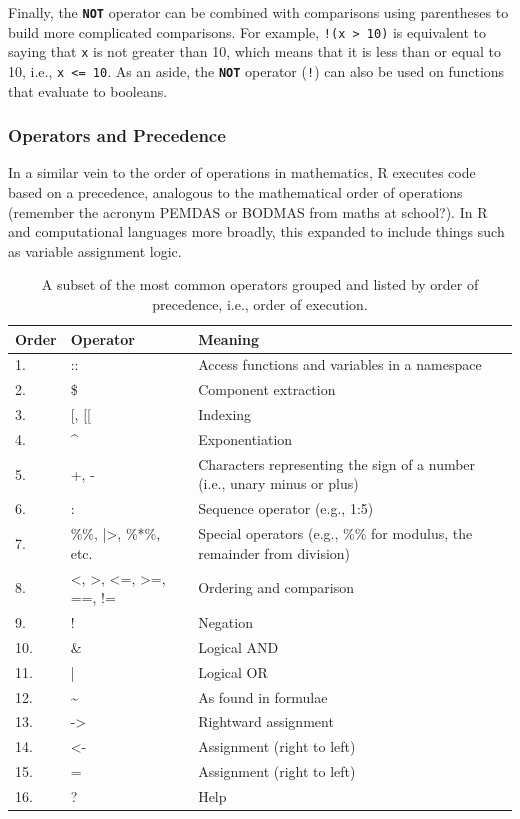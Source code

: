 \documentclass[
]{book}
\begin{document}
Finally, the \textbf{\texttt{NOT}} operator can be combined with comparisons using parentheses to build more complicated comparisons. For example, \texttt{!(x\ \textgreater{}\ 10)} is equivalent to saying that \texttt{x} is not greater than 10, which means that it is less than or equal to 10, i.e., \texttt{x\ \textless{}=\ 10}. As an aside, the \textbf{\texttt{NOT}} operator (\texttt{!}) can also be used on functions that evaluate to booleans.

\subsubsection{Operators and Precedence}\label{operators-and-precedence}

In a similar vein to the order of operations in mathematics, R executes code based on a precedence, analogous to the mathematical order of operations (remember the acronym PEMDAS or BODMAS from maths at school?). In R and computational languages more broadly, this expanded to include things such as variable assignment logic.

\begin{table}

\caption{\label{tab:precedence}A subset of the most common operators grouped and listed by order of precedence, i.e., order of execution.}
\centering
\begin{tabular}[t]{l|l|l}
\hline
Order & Operator & Meaning\\
\hline
1. & :: & Access functions and variables in a namespace\\
\hline
2. & \$ & Component extraction\\
\hline
3. & [, [[ & Indexing\\
\hline
4. & \textasciicircum{} & Exponentiation\\
\hline
5. & +, - & Characters representing the sign of a number (i.e., unary minus or plus)\\
\hline
6. & : & Sequence operator (e.g., 1:5)\\
\hline
7. & \%\%, |>, \%*\%, etc. & Special operators (e.g., \%\% for modulus, the remainder from division)\\
\hline
8. & <, >, <=, >=, ==, != & Ordering and comparison\\
\hline
9. & ! & Negation\\
\hline
10. & \& & Logical AND\\
\hline
11. & | & Logical OR\\
\hline
12. & \textasciitilde{} & As found in formulae\\
\hline
13. & -> & Rightward assignment\\
\hline
14. & <- & Assignment (right to left)\\
\hline
15. & = & Assignment (right to left)\\
\hline
16. & ? & Help\\
\hline
\end{tabular}
\end{table}
\end{document}
